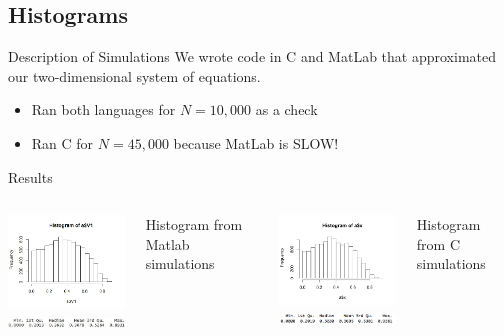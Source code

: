 
\subsection{Histograms}

\begin{frame}{Description of Simulations}
We wrote code in C and MatLab that approximated our two-dimensional system of equations. 
	\begin{itemize}
		\item Ran both languages for $N = 10,000$ as a check
		\item Ran C for $N =45,000$ because MatLab is SLOW!
	\end{itemize}
\end{frame}


\begin{frame}{Results}
 

  \begin{columns}[t]
    \includegraphics[width=6cm]{img/shrimpHistMATLAB} \\
		\includegraphics[width=5.5cm]{img/histSummML}
    \begin{center} Histogram from Matlab simulations \end{center}
    \includegraphics[width=6cm]{img/Rplot} \\
		\includegraphics[width=5.5cm]{img/sumAMAN}
    \begin{center} Histogram from C simulations \end{center}
  \end{columns}


\end{frame}